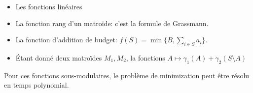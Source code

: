 \documentclass[math, info]{cours}
\begin{document}
\begin{exemple}
	\begin{itemize}
		\item Les fonctions linéaires
		\item La fonction rang d'un matroïde: c'est la formule de Grassmann.
		\item La fonction d'addition de budget: $f(S) = \min \{B, \sum_{i \in S} a_{i}\}$.
		\item Étant donné deux matroïdes $M_{1}, M_{2}$, la fonctions $A \mapsto \gamma_{1}(A) + \gamma_{2}(S \setminus A)$
	\end{itemize}
	Pour ces fonctions sous-modulaires, le problème de minimization peut être résolu en temps polynomial.
\end{exemple}
\end{document}
